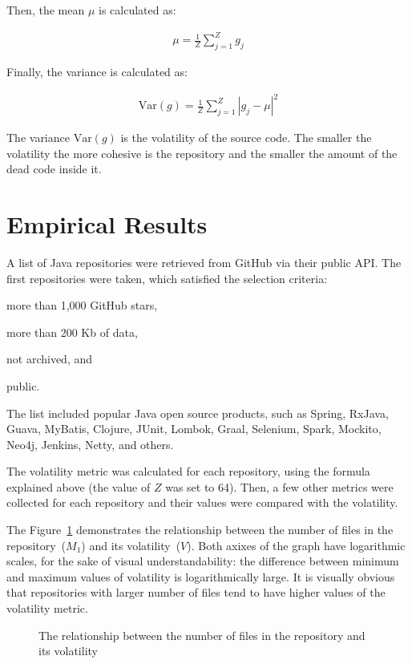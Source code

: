 \documentclass[12pt]{article}
\begin{document}
Then, the mean $\mu$ is calculated as:

\begin{eqnarray}
\mu = \frac{1}{Z}\sum_{j=1}^{Z}{g_j}
\end{eqnarray}

Finally, the variance is calculated as:

\begin{eqnarray}
\text{Var}(g) = \frac{1}{Z}\sum_{j=1}^{Z}{|g_j - \mu|^2}
\end{eqnarray}

The variance $\text{Var}(g)$ is the volatility of the source code. The smaller
the volatility the more cohesive is the repository and the smaller
the amount of the dead code inside it.

\section{Empirical Results}

A list of Java repositories were retrieved from GitHub via their
public API. The first \thetotalrepos{} repositories were taken, which satisfied
the selection criteria:
\begin{enumerate*}[label={\arabic*)}]
\item more than 1,000 GitHub stars,
\item more than 200 Kb of data,
\item not archived, and
\item public.
\end{enumerate*}
The list included popular Java open source products, such as
Spring, RxJava, Guava, MyBatis, Clojure, JUnit, Lombok,
Graal, Selenium, Spark, Mockito, Neo4j, Jenkins, Netty, and others.

The volatility metric was calculated for each repository, using the
formula explained above (the value of $Z$ was set to 64).
Then, a few other metrics were collected
for each repository and their values were compared with the volatility.

The Figure~\ref{fig:1} demonstrates the relationship between
the number of files in the repository~($M_1$) and its volatility~($V$). Both
axixes of the graph have logarithmic scales, for the sake of visual
understandability: the difference between minimum and maximum values
of volatility is logarithmically large. It is visually obvious that
repositories with larger number of files tend to have higher values
of the volatility metric.

\begin{figure}[h]
  
  \caption{The relationship between the number of files in the repository and its volatility}
  \label{fig:1}
\end{figure}
\end{document}

